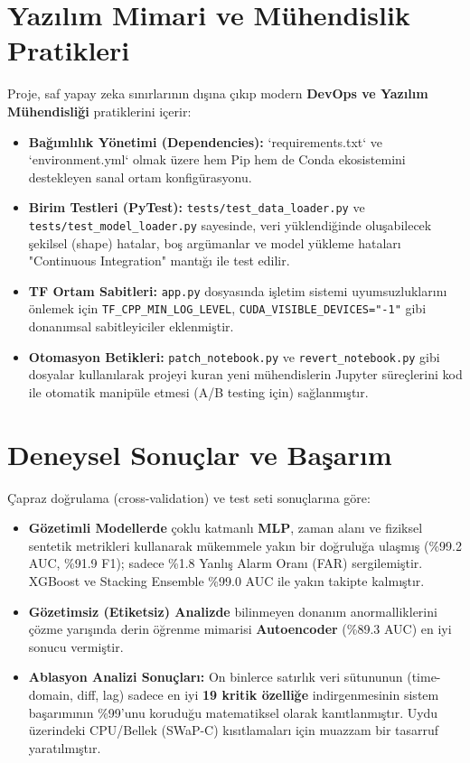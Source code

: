 \documentclass[conference,10pt]{IEEEtran}
\begin{document}
\section{Yazılım Mimari ve Mühendislik Pratikleri}
Proje, saf yapay zeka sınırlarının dışına çıkıp modern \textbf{DevOps ve Yazılım Mühendisliği} pratiklerini içerir:
\begin{itemize}
    \item \textbf{Bağımlılık Yönetimi (Dependencies):} `requirements.txt` ve `environment.yml` olmak üzere hem Pip hem de Conda ekosistemini destekleyen sanal ortam konfigürasyonu.
    \item \textbf{Birim Testleri (PyTest):} \texttt{tests/test\_data\_loader.py} ve \texttt{tests/test\_model\_loader.py} sayesinde, veri yüklendiğinde oluşabilecek şekilsel (shape) hatalar, boş argümanlar ve model yükleme hataları "Continuous Integration" mantığı ile test edilir.
    \item \textbf{TF Ortam Sabitleri:} \texttt{app.py} dosyasında işletim sistemi uyumsuzluklarını önlemek için \texttt{TF\_CPP\_MIN\_LOG\_LEVEL}, \texttt{CUDA\_VISIBLE\_DEVICES="-1"} gibi donanımsal sabitleyiciler eklenmiştir.
    \item \textbf{Otomasyon Betikleri:} \texttt{patch\_notebook.py} ve \texttt{revert\_notebook.py} gibi dosyalar kullanılarak projeyi kuran yeni mühendislerin Jupyter süreçlerini kod ile otomatik manipüle etmesi (A/B testing için) sağlanmıştır.
\end{itemize}

\section{Deneysel Sonuçlar ve Başarım}
Çapraz doğrulama (cross-validation) ve test seti sonuçlarına göre:
\begin{itemize}
    \item \textbf{Gözetimli Modellerde} çoklu katmanlı \textbf{MLP}, zaman alanı ve fiziksel sentetik metrikleri kullanarak mükemmele yakın bir doğruluğa ulaşmış (\%99.2 AUC, \%91.9 F1); sadece \%1.8 Yanlış Alarm Oranı (FAR) sergilemiştir. XGBoost ve Stacking Ensemble \%99.0 AUC ile yakın takipte kalmıştır.
    \item \textbf{Gözetimsiz (Etiketsiz) Analizde} bilinmeyen donanım anormalliklerini çözme yarışında derin öğrenme mimarisi \textbf{Autoencoder} (\%89.3 AUC) en iyi sonucu vermiştir.
    \item \textbf{Ablasyon Analizi Sonuçları:} On binlerce satırlık veri sütununun (time-domain, diff, lag) sadece en iyi \textbf{19 kritik özelliğe} indirgenmesinin sistem başarımının \%99'unu koruduğu matematiksel olarak kanıtlanmıştır. Uydu üzerindeki CPU/Bellek (SWaP-C) kısıtlamaları için muazzam bir tasarruf yaratılmıştır.
\end{itemize}
\end{document}
